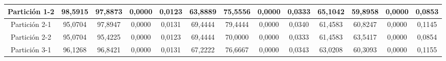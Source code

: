 \documentclass[12pt]{article}
\begin{document}
\begin{table}[H]
{\begin{tabular}{|c|cccc|cccc|cccc|}
Partición 1-2 & \multicolumn{1}{c|}{98,5915}                                                  & \multicolumn{1}{c|}{97,8873}                                                 & \multicolumn{1}{c|}{0,0000}  & 0,0123 & \multicolumn{1}{c|}{63,8889}                                                  & \multicolumn{1}{c|}{75,5556}                                                 & \multicolumn{1}{c|}{0,0000}  & 0,0333 & \multicolumn{1}{c|}{65,1042}                                                  & \multicolumn{1}{c|}{59,8958}                                                 & \multicolumn{1}{c|}{0,0000}  & 0,0853 \\ \hline
Partición 2-1 & \multicolumn{1}{c|}{95,0704}                                                  & \multicolumn{1}{c|}{97,8947}                                                 & \multicolumn{1}{c|}{0,0000}  & 0,0131 & \multicolumn{1}{c|}{69,4444}                                                  & \multicolumn{1}{c|}{79,4444}                                                 & \multicolumn{1}{c|}{0,0000}  & 0,0340 & \multicolumn{1}{c|}{61,4583}                                                  & \multicolumn{1}{c|}{60,8247}                                                 & \multicolumn{1}{c|}{0,0000}  & 0,1145 \\ \hline
Partición 2-2 & \multicolumn{1}{c|}{95,0704}                                                  & \multicolumn{1}{c|}{95,4225}                                                 & \multicolumn{1}{c|}{0,0000}  & 0,0123 & \multicolumn{1}{c|}{69,4444}                                                  & \multicolumn{1}{c|}{70,0000}                                                 & \multicolumn{1}{c|}{0,0000}  & 0,0333 & \multicolumn{1}{c|}{61,4583}                                                  & \multicolumn{1}{c|}{63,5417}                                                 & \multicolumn{1}{c|}{0,0000}  & 0,0854 \\ \hline
Partición 3-1 & \multicolumn{1}{c|}{96,1268}                                                  & \multicolumn{1}{c|}{96,8421}                                                 & \multicolumn{1}{c|}{0,0000}  & 0,0131 & \multicolumn{1}{c|}{67,2222}                                                  & \multicolumn{1}{c|}{76,6667}                                                 & \multicolumn{1}{c|}{0,0000}  & 0,0343 & \multicolumn{1}{c|}{63,0208}                                                  & \multicolumn{1}{c|}{60,3093}                                                 & \multicolumn{1}{c|}{0,0000}  & 0,1155 \\ \hline

\end{tabular}}
\end{table}
\end{document}
